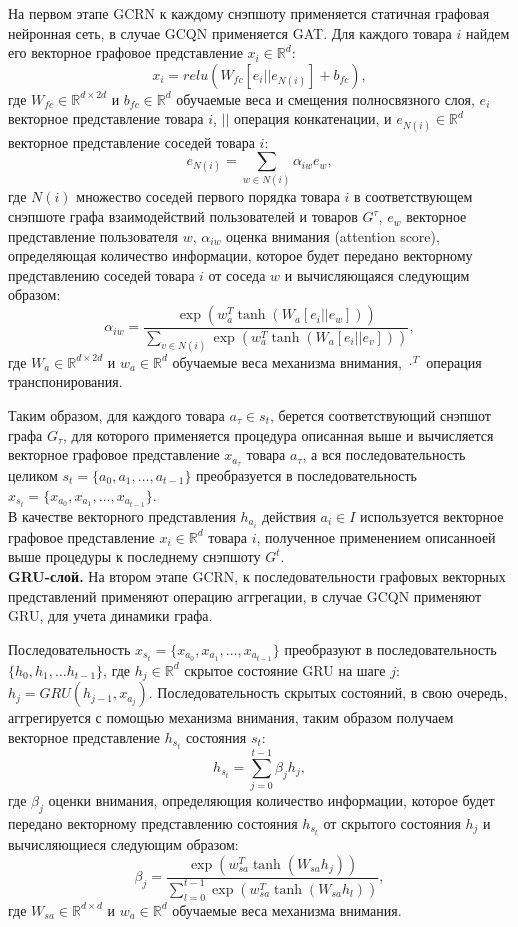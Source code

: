 \documentclass{mipt-thesis-ms}
\begin{document}
На первом этапе GCRN к каждому снэпшоту применяется статичная графовая нейронная сеть, в случае GCQN применяется GAT. Для каждого товара $i$ найдем его векторное графовое представление $x_i \in \mathbb{R}^d$:
$$x_i = {relu}(W_{fc}[e_i || e_{N(i)}] + b_{fc}),$$
где $W_{fc} \in \mathbb{R}^{d \times 2d}$ и $b_{fc} \in \mathbb{R}^d$ обучаемые веса и смещения полносвязного слоя, $e_i$ векторное представление товара $i$, $||$ операция конкатенации, и $e_{N(i)} \in \mathbb{R}^d$ векторное представление соседей товара $i$:
$$e_{N(i)} = \sum_{w \in N(i)} \alpha_{iw}e_w,$$
где $N(i)$ множество соседей первого порядка товара $i$ в соответствующем снэпшоте графа взаимодействий пользователей и товаров $G^{\tau}$, $e_w$ векторное представление пользователя $w$, $\alpha_{iw}$ оценка внимания (attention score), определяющая количество информации, которое будет передано векторному представлению соседей товара $i$ от соседа $w$ и вычисляющаяся следующим образом: 
$$\alpha_{iw} = \frac{\exp(w_a^T\tanh(W_a[e_i || e_w]))}{\sum_{v \in N(i)} \exp(w_a^T \tanh(W_a[e_i || e_v]))},$$
где $W_a \in \mathbb{R}^{d \times 2d}$ и $w_a \in \mathbb{R}^d$ обучаемые веса механизма внимания, $\cdot^T$ операция транспонирования.

Таким образом, для каждого товара $a_{\tau} \in s_t$, берется соответствующий снэпшот графа $G_{\tau}$, для которого применяется процедура описанная выше и вычисляется векторное графовое представление $x_{a_{\tau}}$ товара $a_{\tau}$, а вся последовательность целиком $s_t = \{a_0, a_1, \dots, a_{t-1}\}$ преобразуется в последовательность $x_{s_t} = \{x_{a_0}, x_{a_1}, \dots, x_{a_{t-1}}\}$.\\

В качестве векторного представления $h_{a_i}$ действия $a_i \in I$ используется векторное графовое представление $x_i \in \mathbb{R}^d$ товара $i$, полученное применением описанноей выше процедуры к последнему снэпшоту $G^t$.\\

{\bf GRU-слой.} На втором этапе GCRN, к последовательности графовых векторных представлений применяют операцию аггрегации, в случае GCQN применяют GRU, для учета динамики графа.

Последовательность $x_{s_t} = \{x_{a_0}, x_{a_1}, \dots, x_{a_{t-1}}\}$ преобразуют в последовательность $\{h_0, h_1, \dots h_{t-1}\}$, где $h_j \in \mathbb{R}^d$ скрытое состояние GRU на шаге $j$: $h_j = GRU(h_{j-1}, x_{a_j})$.
Последовательность скрытых состояний, в свою очередь, аггрегируется с помощью механизма внимания, таким образом получаем векторное представление $h_{s_t}$ состояния $s_t$:
$$h_{s_t} = \sum_{j=0}^{t-1} \beta_j h_j,$$
где $\beta_j$ оценки внимания, определяющия количество информации, которое будет передано векторному представлению состояния  $h_{s_t}$ от скрытого состояния $h_j$ и вычисляющиеся следующим образом:
$$\beta_j = \frac{\exp(w_{sa}^T\tanh(W_{sa}h_j))}{\sum_{l=0}^{t-1}\exp(w_{sa}^T\tanh(W_{sa}h_l))},$$
где $W_{sa} \in \mathbb{R}^{d \times d}$ и $w_a \in \mathbb{R}^d$ обучаемые веса механизма внимания.\\
\end{document}
